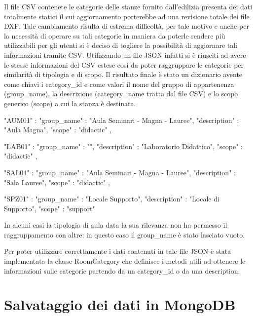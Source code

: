\documentclass[12pt]{report}
\begin{document}
Il file CSV contenete le categorie delle stanze fornito dall'edilizia presenta dei dati totalmente statici il cui aggiornamento porterebbe ad una revisione totale dei file DXF.
Tale cambiamento risulta di estrema difficoltà, per tale motivo e anche per la necessità di operare su tali categorie in maniera da poterle rendere più utilizzabili per gli utenti si è deciso di togliere la possibilità di aggiornare tali informazioni tramite CSV.
Utilizzando un file JSON infatti si è riusciti ad avere le stesse informazioni del CSV estese così da poter raggruppare le categorie per similarità di tipologia e di scopo. 
Il risultato finale è stato un dizionario avente come chiavi i category\_id e come valori il nome del gruppo di appartenenza (group\_name), la descrizione (category\_name tratta dal file CSV) e lo scopo generico (scope) a cui la stanza è destinata.

\newpage

\begin{dict}[title=Esempio delle categorie di stanze memorizzate in 'room\_categories.json', frame=single]
"AUM01" : {
   "group_name"   : "Aula Seminari - Magna - Lauree",
   "description"  : "Aula Magna",
   "scope"        : "didactic"
},

"LAB01" : {
   "group_name"   : "",
   "description"  : "Laboratorio Didattico",
   "scope"        : "didactic"
},

"SAL04" : {
   "group_name"   : "Aula Seminari - Magna - Lauree",
   "description"  : "Sala Lauree",
   "scope"        : "didactic"
},

"SPZ01" : {
   "group_name"   : "Locale Supporto",
   "description"  : "Locale di Supporto",
   "scope"        : "support"
}
\end{dict}

\vspace{5mm} %

In alcuni casi la tipologia di aula data la sua rilevanza non ha permesso il raggruppamento con altre: in questo caso il group\_name è stato lasciato vuoto.

Per poter utilizzare correttamente i dati contenuti in tale file JSON è stata implementata la classe RoomCategory che definisce i metodi utili ad ottenere le informazioni sulle categorie partendo da un category\_id o da una description.


\newpage
\section{Salvataggio dei dati in MongoDB}
\end{document}
